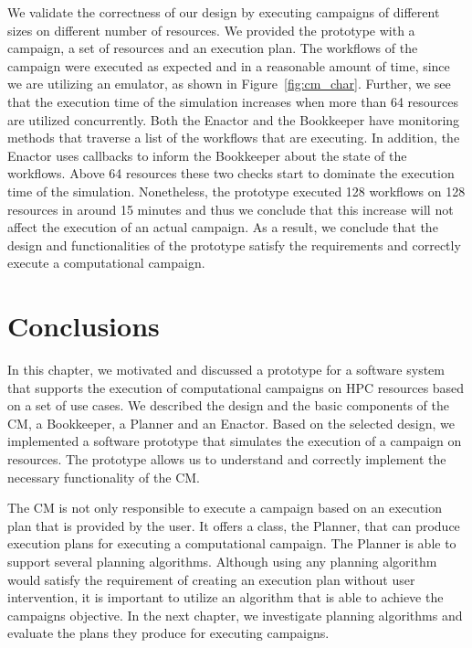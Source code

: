 We validate the correctness of our design by executing campaigns of different 
sizes on different number of resources. We provided the prototype with a 
campaign, a set of resources and an execution plan. The workflows of the 
campaign were executed as expected and in a reasonable amount of time, since 
we are utilizing an emulator, as shown in Figure~\ref{fig:cm_char}. Further, 
we see that the execution time of the simulation increases when more than 64 
resources are utilized concurrently. Both the Enactor and the Bookkeeper have 
monitoring methods that traverse a list of the workflows that are executing. 
In addition, the Enactor uses callbacks to inform the Bookkeeper about the 
state of the workflows. Above 64 resources these two checks start to dominate 
the execution time of the simulation. Nonetheless, the prototype executed 128 
workflows on 128 resources in around 15 minutes and thus we conclude that this 
increase will not affect the execution of an actual campaign. As a result, we 
conclude that the design and functionalities of the prototype satisfy the 
requirements and correctly execute a computational campaign.


\section{Conclusions}
\label{sec:cm_concl}
In this chapter, we motivated and discussed a prototype for a software system 
that supports the execution of computational campaigns on HPC resources based 
on a set of use cases. We described the design and the basic components of the 
CM, a Bookkeeper, a Planner and an Enactor. Based on the 
selected design, we implemented a software prototype that simulates the 
execution of a campaign on resources. The prototype allows us to understand 
and correctly implement the necessary functionality of the CM.

The CM is not only responsible to execute a campaign based on an 
execution plan that is provided by the user. It offers a class, the Planner, 
that can produce execution plans for executing a computational campaign. The 
Planner is able to support several planning algorithms. Although using any 
planning algorithm would satisfy the requirement of creating an execution plan 
without user intervention, it is important to utilize an algorithm that is 
able to achieve the campaigns objective. In the next chapter, we investigate 
planning algorithms and evaluate the plans they produce for executing 
campaigns.

